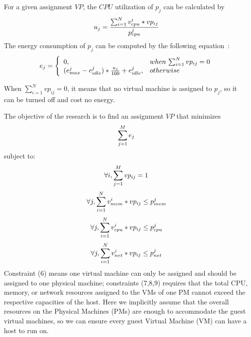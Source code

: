 \documentclass[10pt, conference, compsocconf]{IEEEtran}
\begin{document}
 For a given assignment $VP$, the $CPU$ utilization of $p_j$ can be calculated by\\
 \begin{equation}\label{3}
 u_j=\frac{
\sum_{i=1}^Nv_{cpu}^i*vp_{ij}
 }{p_{cpu}^j} \\
\end{equation}
 The energy consumption of $p_j$ can be computed by the following
 equation~\cite{beloglazov10}:
\begin{equation}\label{4}
    e_j=\Bigg\lbrace \begin{array}{ll}
     0,& when \, \sum_{i=1}^Nvp_{ij}=0  \\
(e_{max}^j-e_{idle}^j)*\frac{u_j}{100}+e_{idle}^j,& otherwise\\
    \end{array} \\
\end{equation}

 When $\sum_{i=1}^Nvp_{ij} =0$, it means that no virtual machine is assigned to
 $p_j$, so it can be turned off and cost no energy.

 The objective of the research is to find an assignment $VP$ that minimizes \\
\begin{equation}\label{5}
\sum_{j=1}^Me_j  \\
\end{equation}
subject to: \\
\begin{equation}\label{6}
\forall i,\sum_{j=1}^Mvp_{ij}=1  \\
\end{equation}
\begin{equation}\label{7}
\forall j, \sum_{i=1}^Nv_{mem}^i*vp_{ij}\leq p_{mem}^j \\
\end{equation}
\begin{equation}\label{8}
\forall j, \sum_{i=1}^Nv_{cpu}^i*vp_{ij}\leq p_{cpu}^j \\
\end{equation}
\begin{equation}\label{9}
\forall j, \sum_{i=1}^Nv_{net}^i*vp_{ij}\leq p_{net}^j \\
\end{equation}
Constraint (6) means one virtual machine can only be assigned and should be
assigned to one physical machine; constraints (7,8,9) requires that the total
CPU, memory, or network resources assigned to the VMs of one PM cannot exceed
the respective capacities of the host. Here we implicitly assume that the
overall resources on the Physical Machines (PMs) are enough to accommodate the
guest virtual machines, so we can ensure every guest Virtual Machine (VM) can
have a host to run on.
\end{document}

